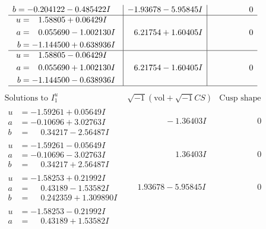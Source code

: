\documentclass[1p]{elsarticle_modified}
\theoremstyle{definition}
\newcommand{\I}{\sqrt{-1}}
\begin{document}
$$\begin{array}{c|c|c}
\begin{aligned}
b &= -0.204122 - 0.485422 I\end{aligned}
 & -1.93678 - 5.95845 I & \phantom{-0.000000 } 0 \\ \hline\begin{aligned}
u &= \phantom{-}1.58805 + 0.06429 I \\
a &= \phantom{-}0.055690 - 1.002130 I \\
b &= -1.144500 + 0.638936 I\end{aligned}
 & \phantom{-}6.21754 + 1.60405 I & \phantom{-0.000000 } 0 \\ \hline\begin{aligned}
u &= \phantom{-}1.58805 - 0.06429 I \\
a &= \phantom{-}0.055690 + 1.002130 I \\
b &= -1.144500 - 0.638936 I\end{aligned}
 & \phantom{-}6.21754 - 1.60405 I & \phantom{-0.000000 } 0\\
 \hline 
 \end{array}$$\newpage$$\begin{array}{c|c|c}  
\text{Solutions to }I^u_{1}& \I (\text{vol} + \sqrt{-1}CS) & \text{Cusp shape}\\
 \hline 
\begin{aligned}
u &= -1.59261 + 0.05649 I \\
a &= -0.10696 + 3.02763 I \\
b &= \phantom{-}0.34217 - 2.56487 I\end{aligned}
 & \phantom{-0.000000 } -1.36403 I & \phantom{-0.000000 } 0 \\ \hline\begin{aligned}
u &= -1.59261 - 0.05649 I \\
a &= -0.10696 - 3.02763 I \\
b &= \phantom{-}0.34217 + 2.56487 I\end{aligned}
 & \phantom{-0.000000 -}1.36403 I & \phantom{-0.000000 } 0 \\ \hline\begin{aligned}
u &= -1.58253 + 0.21992 I \\
a &= \phantom{-}0.43189 - 1.53582 I \\
b &= \phantom{-}0.242359 + 1.309890 I\end{aligned}
 & \phantom{-}1.93678 - 5.95845 I & \phantom{-0.000000 } 0 \\ \hline\begin{aligned}
u &= -1.58253 - 0.21992 I \\
a &= \phantom{-}0.43189 + 1.53582 I \\

\end{aligned}
\end{array}$$
\end{document}
